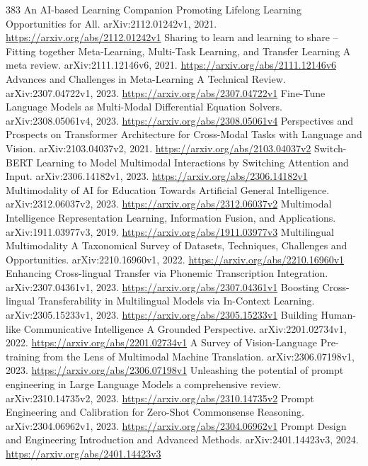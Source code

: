 \documentclass[11pt]{article}
\begin{document}
\begin{thebibliography}{383}
 An AI-based Learning Companion Promoting Lifelong Learning Opportunities for All. arXiv:2112.01242v1, 2021. \url{https://arxiv.org/abs/2112.01242v1}
 Sharing to learn and learning to share -- Fitting together Meta-Learning, Multi-Task Learning, and Transfer Learning A meta review. arXiv:2111.12146v6, 2021. \url{https://arxiv.org/abs/2111.12146v6}
 Advances and Challenges in Meta-Learning A Technical Review. arXiv:2307.04722v1, 2023. \url{https://arxiv.org/abs/2307.04722v1}
 Fine-Tune Language Models as Multi-Modal Differential Equation Solvers. arXiv:2308.05061v4, 2023. \url{https://arxiv.org/abs/2308.05061v4}
 Perspectives and Prospects on Transformer Architecture for Cross-Modal Tasks with Language and Vision. arXiv:2103.04037v2, 2021. \url{https://arxiv.org/abs/2103.04037v2}
 Switch-BERT Learning to Model Multimodal Interactions by Switching Attention and Input. arXiv:2306.14182v1, 2023. \url{https://arxiv.org/abs/2306.14182v1}
 Multimodality of AI for Education Towards Artificial General Intelligence. arXiv:2312.06037v2, 2023. \url{https://arxiv.org/abs/2312.06037v2}
 Multimodal Intelligence Representation Learning, Information Fusion, and Applications. arXiv:1911.03977v3, 2019. \url{https://arxiv.org/abs/1911.03977v3}
 Multilingual Multimodality A Taxonomical Survey of Datasets, Techniques, Challenges and Opportunities. arXiv:2210.16960v1, 2022. \url{https://arxiv.org/abs/2210.16960v1}
 Enhancing Cross-lingual Transfer via Phonemic Transcription Integration. arXiv:2307.04361v1, 2023. \url{https://arxiv.org/abs/2307.04361v1}
 Boosting Cross-lingual Transferability in Multilingual Models via In-Context Learning. arXiv:2305.15233v1, 2023. \url{https://arxiv.org/abs/2305.15233v1}
 Building Human-like Communicative Intelligence A Grounded Perspective. arXiv:2201.02734v1, 2022. \url{https://arxiv.org/abs/2201.02734v1}
 A Survey of Vision-Language Pre-training from the Lens of Multimodal Machine Translation. arXiv:2306.07198v1, 2023. \url{https://arxiv.org/abs/2306.07198v1}
 Unleashing the potential of prompt engineering in Large Language Models a comprehensive review. arXiv:2310.14735v2, 2023. \url{https://arxiv.org/abs/2310.14735v2}
 Prompt Engineering and Calibration for Zero-Shot Commonsense Reasoning. arXiv:2304.06962v1, 2023. \url{https://arxiv.org/abs/2304.06962v1}
 Prompt Design and Engineering Introduction and Advanced Methods. arXiv:2401.14423v3, 2024. \url{https://arxiv.org/abs/2401.14423v3}

\end{thebibliography}
\end{document}

